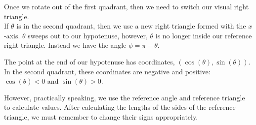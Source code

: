 \documentclass{ximera}
\begin{document}
\begin{image}
\end{image}




Once we rotate out of the first quadrant, then we need to switch our visual right triangle. \\


If $\theta$ is in the second quadrant, then we use a new right triangle formed with the $x$-axis. $\theta$ sweeps out to our hypotenuse, however, $\theta$ is no longer inside our reference right triangle.  Instead we have the angle $\phi = \pi - \theta$.  

The point at the end of our hypotenuse has coordinates, $(\cos(\theta), \sin(\theta))$.  In the second quadrant, these coordinates are negative and positive: $\cos(\theta) < 0$ and $\sin(\theta) > 0$.

However, practically speaking, we use the reference angle and reference triangle to calculate values.  After calculating the lengths of the sides of the reference triangle, we must remember to change their signs appropriately. 
\end{document}
